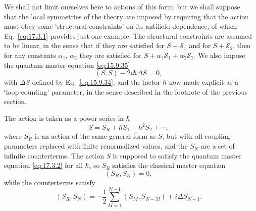 We shall not limit ourselves here to actions of this form, but we shall
suppose that the local symmetries of the theory are imposed by requiring
that the action must obey some `structural constraints' on its antifield
dependence, of which Eq.~\eqref{eq:17.3.1} provides just one example. The
structural constraints are assumed to be linear, in the sense that if they
are satisfied for $S+\mathcal S_1$ and for $S+\mathcal S_2$, then for any
constants $\alpha_1$, $\alpha_2$ they are satisfied for
$S+\alpha_1\mathcal S_1+\alpha_2\mathcal S_2$. We also impose the quantum
master equation \eqref{eq:15.9.35}
\begin{equation}
(S,S)-2i\hbar\Delta S=0,
\label{eq:17.3.2}
\end{equation}
with $\Delta S$ defined by Eq.~\eqref{eq:15.9.34}, and the factor $\hbar$ now made
explicit as a `loop-counting' parameter, in the sense described in the
footnote of the previous section.

The action is taken as a power series in $\hbar$
\begin{equation}
S=S_R+\hbar S_1+\hbar^2S_2+\cdots,
\label{eq:17.3.3}
\end{equation}
where $S_R$ is an action of the same general form as $S$, but with all
coupling parameters replaced with finite renormalized values, and the $S_N$
are a set of infinite counterterms. The action $S$ is supposed to satisfy
the quantum master equation \eqref{eq:17.3.2} for all $\hbar$, so $S_R$
satisfies the classical master equation
\begin{equation}
(S_R,S_R)=0,
\label{eq:17.3.4}
\end{equation}
while the counterterms satisfy
\begin{equation}
(S_R,S_N)=-\frac12\sum_{M=1}^{N-1}(S_M,S_{N-M})+i\Delta S_{N-1}.
\label{eq:17.3.5}
\end{equation}

